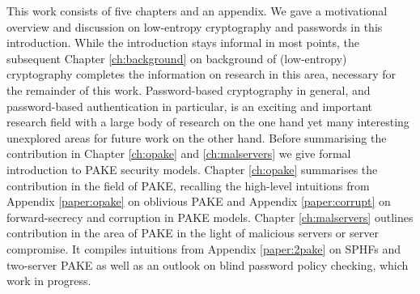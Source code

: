 This work consists of five chapters and an appendix.
We gave a motivational overview and discussion on low-entropy cryptography and passwords in this introduction.
While the introduction stays informal in most points, the subsequent Chapter \ref{ch:background} on background of (low-entropy) cryptography completes the information on research in this area, necessary for the remainder of this work.
Password-based cryptography in general, and password-based authentication in particular, is an exciting and important research field with a large body of research on the one hand yet many interesting unexplored areas for future work on the other hand.
Before summarising the contribution in Chapter \ref{ch:opake} and \ref{ch:malservers} we give formal introduction to \acl{PAKE} security models.
Chapter \ref{ch:opake} summarises the contribution in the field of \acl{PAKE}, \ie recalling the high-level intuitions from Appendix \ref{paper:opake} on oblivious \ac{PAKE} and Appendix \ref{paper:corrupt} on forward-secrecy and corruption in \ac{PAKE} models.
Chapter \ref{ch:malservers} outlines contribution in the area of \ac{PAKE} in the light of malicious servers or server compromise.
It compiles intuitions from Appendix \ref{paper:2pake} on \aclp{SPHF} and two-server \ac{PAKE} as well as an outlook on blind password policy checking, which work in progress.

